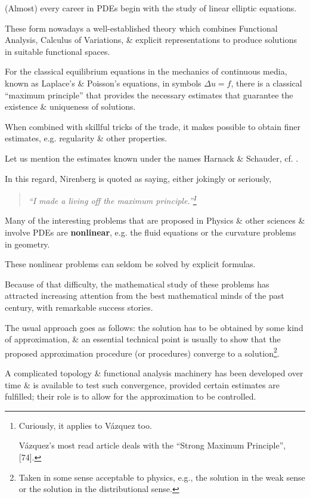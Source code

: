 \documentclass{article}
\begin{document}
(Almost) every career in PDEs begin with the study of linear elliptic equations.

These form nowadays a well-established theory which combines Functional Analysis, Calculus of Variations, \& explicit representations to produce solutions in suitable functional spaces.

For the classical equilibrium equations in the mechanics of continuous media, known as Laplace's \& Poisson's equations, in symbols $\Delta u = f$, there is a classical ``maximum principle'' that provides the necessary estimates that guarantee the existence \& uniqueness of solutions.

When combined with skillful tricks of the trade, it makes possible to obtain finer estimates, e.g. regularity \& other properties.

Let us mention the estimates known under the names Harnack \& Schauder, cf. \cite{Evans2010, Gilbarg_Trudinger2001}.

In this regard, Nirenberg is quoted as saying, either jokingly or seriously,
\begin{quotation}\it
	``I made a living off the maximum principle.''\footnote{Curiously, it applies to V\'azquez too.
		
		V\'azquez's most read article deals with the ``Strong Maximum Principle'', [74].}
\end{quotation}
Many of the interesting problems that are proposed in Physics \& other sciences \& involve PDEs are \textbf{nonlinear}, e.g. the fluid equations or the curvature problems in geometry.

These nonlinear problems can seldom be solved by explicit formulas.

Because of that difficulty, the mathematical study of these problems has attracted increasing attention from the best mathematical minds of the past century, with remarkable success stories.

The usual approach goes as follows: the solution has to be obtained by some kind of approximation, \& an essential technical point is usually to show that the proposed approximation procedure (or procedures) converge to a solution\footnote{Taken in some sense acceptable to physics, e.g., the solution in the weak sense or the solution in the distributional sense.}.

A complicated topology \& functional analysis machinery has been developed over time \& is available to test such convergence, provided certain estimates are fulfilled; their role is to allow for the approximation to be controlled.
\end{document}
